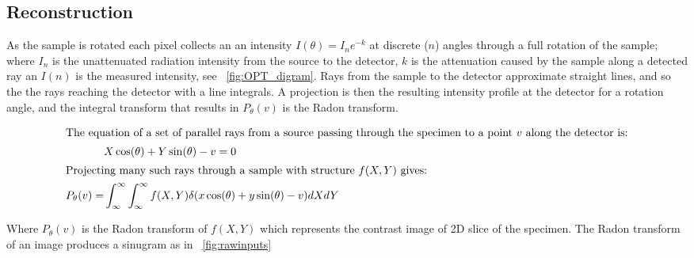 \subsection{Reconstruction}

As the sample is rotated each pixel collects an an intensity \(I(\theta) = I_{n}e^{-k}\) at discrete (\(n\)) angles through a full rotation of the sample; where \(I_{n}\) is the unattenuated radiation intensity from the source to the detector, $k$ is the attenuation caused by the sample along a detected ray an \(I(n)\) is the measured intensity, see \figurename~\ref{fig:OPT_digram}.
Rays from the sample to the detector approximate straight lines, and so the the rays reaching the detector with a line integrals.
A projection is then the resulting intensity profile at the detector for a rotation angle, and the integral transform that results in \(P_\theta(v)\)
is the \gls{Radon transform}.

\begin{align}
    \intertext{The equation of a set of parallel rays from a source passing through the specimen to a point \(v\) along the detector is:}
    &X\cos(\theta) + Y\sin(\theta) - v = 0 \\
    \intertext{Projecting many such rays through a sample with structure \(f(X,Y)\) gives:}
    P_\theta(v) = &\int_{\infty}^{\infty} \int_{\infty}^{\infty} f(X,Y)\delta (x\cos(\theta)+y \sin(\theta)-v)dX dY
\end{align}


Where $P_\theta(v)$ is the \gls{Radon transform} of $f(X,Y)$ which represents the contrast image of \gls{2D} slice of the specimen.
The \gls{Radon transform} of an image produces a sinugram as in \figurename~\ref{fig:rawinputs}


